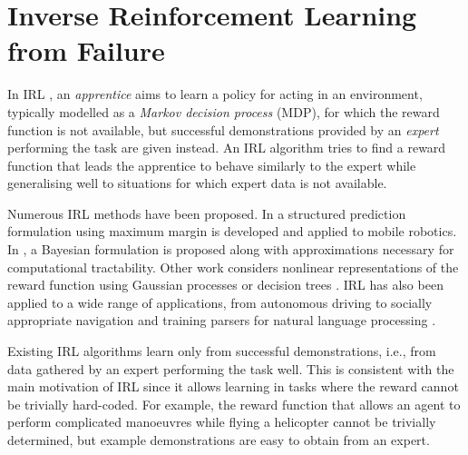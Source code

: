 \documentclass[a4paper,11pt]{report}
\begin{document}
\section{Inverse Reinforcement Learning from Failure}
\label{sec:irlf}

In IRL \cite{ng2000algorithms}, an \emph{apprentice} aims to learn a policy for acting in an environment, typically modelled as a \emph{Markov decision process} (MDP), for which the reward function is not available, but successful demonstrations provided by an \emph{expert} performing the task are given instead. An IRL algorithm tries to find a reward function that leads the apprentice to behave  similarly to the expert while generalising well to situations for which expert data is not available. 


Numerous IRL methods have been proposed. In \cite{ratliff2006maximum} a structured prediction formulation using maximum margin is developed and applied to mobile robotics. In \cite{ramachandran2007bayesian},  a  Bayesian formulation is proposed along with approximations necessary for computational tractability. Other work considers nonlinear representations of the reward function using Gaussian processes \cite{levine2011nonlinear} or decision trees \cite{ratliff2007boosting}. IRL has also been applied to a wide range of applications, from  autonomous driving \cite{abbeel2004apprenticeship,kuderer2015learning} to socially appropriate navigation \cite{henry2010learning,vasquez2014inverse} and training parsers for natural language processing \cite{neu2009training}.


Existing IRL algorithms learn only from successful demonstrations, i.e., from data gathered by an expert performing the task well. This is consistent with the main motivation of IRL since it allows learning in tasks where the reward cannot be trivially hard-coded.  For example, the reward function that allows an agent to perform complicated manoeuvres while flying a helicopter cannot be trivially determined, but example demonstrations are easy to obtain from an expert.
\end{document}
